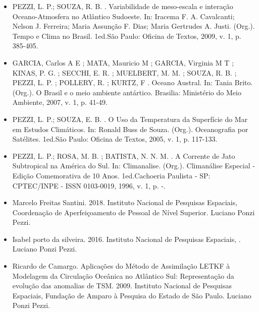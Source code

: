 \documentclass[11pt, a4paper]{awesome-cv}
\begin{document}
\begin{cvletter}
\begin{itemize}
  \item[] PEZZI, L. P.; SOUZA, R. B. . Variabilidade de meso-escala e 
  interação Oceano-Atmosfera no Atlântico Sudoeste. In: Iracema F. A. Cavalcanti; 
  Nelson J. Ferreira; Maria Assunção F. Dias; Maria Gertrudes A. Justi. (Org.). 
  Tempo e Clima no Brasil. 1ed.São Paulo: Oficina de Textos, 2009, v. 1, p. 385-405. 

  \item[] 
  GARCIA, Carlos A E ; MATA, Mauricio M ; GARCIA, Virginia M T ; KINAS, P. G. ; SECCHI, E. R. ; 
  MUELBERT, M. M. ; SOUZA, R. B. ; PEZZI, L. P. ; POLLERY, R. ; KURTZ, F . 
  Oceano Austral. In: Tania Brito. (Org.). O Brasil e o meio ambiente antártico. Brasilia: 
  Ministério do Meio Ambiente, 2007, v. 1, p. 41-49.

  \item[] PEZZI, L. P.; SOUZA, E. B. . O Uso da Temperatura da Superfície do Mar 
  em Estudos Climáticos. In: Ronald Buss de Souza. (Org.). Oceanografia por Satélites. 
  1ed.São Paulo: Oficina de Textos, 2005, v. 1, p. 117-133. 

  \item[] PEZZI, L. P.; ROSA, M. B. ; BATISTA, N. N. M. . A Corrente de Jato Subtropical na 
  América do Sul. In: Climanalise. (Org.). Climanálise Especial - Edição Comemorativa de 
  10 Anos. 1ed.Cachoeria Paulista - SP: CPTEC/INPE - ISSN 0103-0019, 1996, v. 1, p. -. 
\end{itemize}

\begin{itemize}
  \item[] Marcelo Freitas Santini. 2018. Instituto Nacional de Pesquisas Espaciais, Coordenação de Aperfeiçoamento de Pessoal de Nível Superior. Luciano Ponzi Pezzi. 
  \item[] Isabel porto da silveira. 2016. Instituto Nacional de Pesquisas Espaciais, . Luciano Ponzi Pezzi. 
  \item[] Ricardo de Camargo. Aplicações do Método de Assimilação LETKF à Modelagem da Circulação Oceânica no Atlântico Sul: Representação da evolução das anomalias de TSM. 2009. Instituto Nacional de Pesquisas Espaciais, Fundação de Amparo à Pesquisa do Estado de São Paulo. Luciano Ponzi Pezzi. 
\end{itemize}


\end{cvletter}
\end{document}
